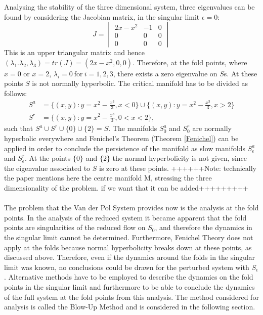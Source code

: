 Analysing the stability of the three dimensional system, three eigenvalues can be found by considering the Jacobian matrix, in the singular limit $\epsilon=0$: 
\begin{equation} 
J=\begin{vmatrix} 2x-x^2 & -1&0 \\ 0 & 0&0\\0&0&0\end{vmatrix}
\label{eq: Eigenvalues}
\end{equation}
This is an upper triangular matrix and hence $(\lambda_1.\lambda_2,\lambda_3)=tr(J)= (2x-x^2,0,0)$. Therefore, at the fold points, where $x=0$ or $x=2$, $\lambda_i=0 \ \text{for} \ i=1,2,3$, there exists a zero eigenvalue on $S$s. At these points $S$ is not normally hyperbolic.
The critical manifold has to be divided as follows:
\begin{align*}
S^a &= \{ (x,y): y = x^2-\frac{x^3}{3}, x< 0 \} \cup  \{ (x,y): y = x^2-\frac{x^3}{3}, x>2 \} \\
S^r &= \{ (x,y): y = x^2-\frac{x^3}{3}, 0< x< 2 \},
\end{align*}
such that $S^a \cup S^r \cup \{0\} \cup \{2\} = S$.
The manifolds $S^a_0$ and $S^r_0$ are normally hyperbolic everywhere and Fenichel's Theorem (Theorem \ref{Fenichel}) can be applied in order to conclude the persistence of the manifold as slow manifolds $S^a_\epsilon$ and $S^r_\epsilon$. At the points $\{0\}$ and $\{2 \}$ the normal hyperbolicity is not given, since the eigenvalue associated to $S$ is zero at these points.
++++++Note: technically the paper mentions here the centre manifold M, stressing the three dimensionality of the problem. if we want that it can be added+++++++++
\\
\\
The problem that the Van der Pol System provides now is the analysis at the fold points.
In the analysis of the reduced system it became apparent that the fold points are singularities of the reduced flow on $S_0$, and therefore the dynamics in the singular limit cannot be determined. Furthermore, Fenichel Theory does not apply at the folds because normal hyperbolicity breaks down at these points, as discussed above. Therefore, even if the dynamics around the folds in the singular limit was known, no conclusions could be drawn for the perturbed system with $S_\epsilon$.
Alternative methods have to be employed to describe the dynamics on the fold points in the singular limit and furthermore to be able to conclude the dynamics of the full system at the fold points from this analysis.
The method considered for analysis is called the Blow-Up Method and is considered in the following section.























